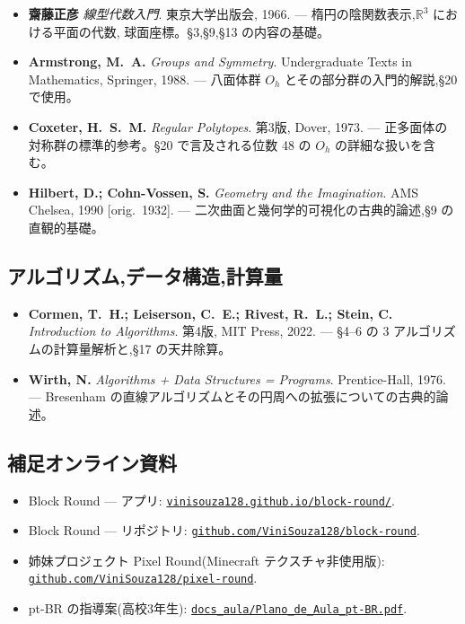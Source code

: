 \documentclass[12pt,a4paper]{scrartcl}
\newcommand{\biblink}[2]{\href{#1}{\nolinkurl{#2}}}
\begin{document}
\begin{itemize}[leftmargin=1.4em,itemsep=0.3em,topsep=0.3em]
  \item \textbf{齋藤正彦} \emph{線型代数入門}. 東京大学出版会, 1966.
        --- 楕円の陰関数表示,$\mathbb{R}^3$ における平面の代数,
        球面座標。§3,§9,§13 の内容の基礎。

  \item \textbf{Armstrong, M.~A.} \emph{Groups and Symmetry}. Undergraduate Texts in
        Mathematics, Springer, 1988.
        --- 八面体群 $O_h$ とその部分群の入門的解説,§20 で使用。

  \item \textbf{Coxeter, H.~S.~M.} \emph{Regular Polytopes}. 第3版, Dover, 1973.
        --- 正多面体の対称群の標準的参考。§20 で言及される位数 48 の $O_h$ の詳細な扱いを含む。

  \item \textbf{Hilbert, D.; Cohn-Vossen, S.} \emph{Geometry and the Imagination}.
        AMS Chelsea, 1990 [orig.~1932].
        --- 二次曲面と幾何学的可視化の古典的論述,§9 の直観的基礎。
\end{itemize}

\subsection*{アルゴリズム,データ構造,計算量}

\begin{itemize}[leftmargin=1.4em,itemsep=0.3em,topsep=0.3em]
  \item \textbf{Cormen, T.~H.; Leiserson, C.~E.; Rivest, R.~L.; Stein, C.}
        \emph{Introduction to Algorithms}. 第4版, MIT Press, 2022.
        --- §4--6 の 3 アルゴリズムの計算量解析と,§17 の天井除算。

  \item \textbf{Wirth, N.} \emph{Algorithms + Data Structures = Programs}.
        Prentice-Hall, 1976.
        --- Bresenham の直線アルゴリズムとその円周への拡張についての古典的論述。
\end{itemize}

\subsection*{補足オンライン資料}

\begin{itemize}[leftmargin=1.4em,itemsep=0.3em,topsep=0.3em]
  \item Block Round --- アプリ: \biblink{https://vinisouza128.github.io/block-round/}{vinisouza128.github.io/block-round/}.
  \item Block Round --- リポジトリ: \biblink{https://github.com/ViniSouza128/block-round}{github.com/ViniSouza128/block-round}.
  \item 姉妹プロジェクト Pixel Round(Minecraft テクスチャ非使用版):
        \biblink{https://github.com/ViniSouza128/pixel-round}{github.com/ViniSouza128/pixel-round}.
  \item pt-BR の指導案(高校3年生):
        \biblink{https://vinisouza128.github.io/block-round/docs_aula/Plano_de_Aula_pt-BR.pdf}{docs\_aula/Plano\_de\_Aula\_pt-BR.pdf}.
\end{itemize}
\end{document}
